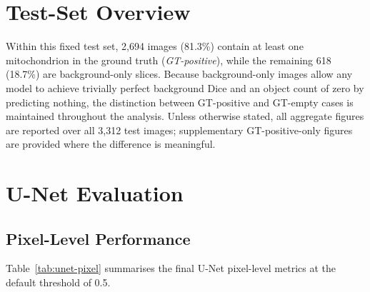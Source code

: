 \documentclass[logo,bsc,singlespacing,parskip,online]{infthesis}
\begin{document}
\section{Test-Set Overview}
\label{sec:test-overview}

Within this fixed test set, 2,694 images (81.3\%) contain at least one
mitochondrion in the ground truth (\emph{GT-positive}), while the remaining 618
(18.7\%) are background-only slices. Because background-only images allow any
model to achieve trivially perfect background Dice and an object count of zero
by predicting nothing, the distinction between GT-positive and GT-empty cases is
maintained throughout the analysis. Unless otherwise stated, all aggregate
figures are reported over all 3,312 test images; supplementary GT-positive-only
figures are provided where the difference is meaningful.


\section{U-Net Evaluation}
\label{sec:unet-results}

\subsection{Pixel-Level Performance}
\label{sec:unet-pixel}

Table~\ref{tab:unet-pixel} summarises the final U-Net pixel-level metrics at
the default threshold of 0.5.
\end{document}
